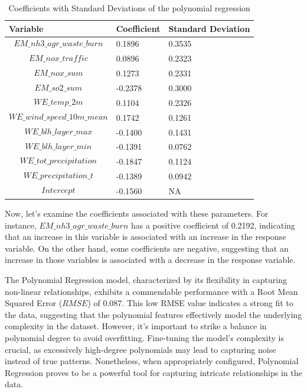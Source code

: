 \documentclass[10pt]{article} %
\begin{document}
    \begin{table}[h]
    \centering
    \begin{tabular}{lll}
    \toprule
    Variable & Coefficient & Standard Deviation \\
    \midrule
    $$EM\_nh3\_agr\_waste\_burn$$ & 0.1896 & 0.3535 \\
    $$EM\_nox\_traffic$$ & 0.0896 & 0.2323 \\
    $$EM\_nox\_sum$$ & 0.1273 & 0.2331 \\
    $$EM\_so2\_sum$$ & -0.2378 & 0.3000 \\
    $$WE\_temp\_2m$$ & 0.1104 & 0.2326 \\
    $$WE\_wind\_speed\_10m\_mean$$ & 0.1742 & 0.1261 \\
    $$WE\_blh\_layer\_max$$ & -0.1400 & 0.1431 \\
    $$WE\_blh\_layer\_min$$ & -0.1391 & 0.0762 \\
    $$WE\_tot\_precipitation$$ & -0.1847 & 0.1124 \\
    $$WE\_precipitation\_t$$ & -0.1389 & 0.0942 \\
    $$Intercept$$ & -0.1560 & NA \\
    \bottomrule
    \end{tabular}
    \caption{Coefficients with Standard Deviations of the polynomial regression}
    \label{tab:coefficients}
    \end{table}

    Now, let's examine the coefficients associated with these parameters. For instance, $EM\_nh3\_agr\_waste\_burn$ has a positive coefficient of 0.2192, indicating that an increase in this variable is associated with an increase in the response variable. On the other hand, some coefficients are negative, suggesting that an increase in those variables is associated with a decrease in the response variable.

    The Polynomial Regression model, characterized by its flexibility in capturing non-linear relationships, exhibits a commendable performance with a Root Mean Squared Error ($RMSE$) of $0.087$. This low RMSE value indicates a strong fit to the data, suggesting that the polynomial features effectively model the underlying complexity in the dataset. However, it's important to strike a balance in polynomial degree to avoid overfitting. Fine-tuning the model's complexity is crucial, as excessively high-degree polynomials may lead to capturing noise instead of true patterns. Nonetheless, when appropriately configured, Polynomial Regression proves to be a powerful tool for capturing intricate relationships in the data.
    
\end{document}
